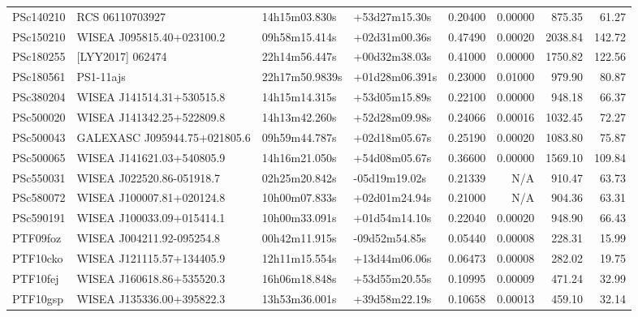 \begin{longtable}{llllrrrr}
PSc140210        &                 RCS 06110703927 &   14h15m03.830s &   +53d27m15.30s &  0.20400 &  0.00000 &   875.35 &       61.27 \\
PSc150210        &       WISEA J095815.40+023100.2 &   09h58m15.414s &   +02d31m00.36s &  0.47490 &  0.00020 &  2038.84 &      142.72 \\
PSc180255        &                [LYY2017] 062474 &   22h14m56.447s &   +00d32m38.03s &  0.41000 &  0.00000 &  1750.82 &      122.56 \\
PSc180561        &                       PS1-11ajs &  22h17m50.9839s &  +01d28m06.391s &  0.23000 &  0.01000 &   979.90 &       80.87 \\
PSc380204        &       WISEA J141514.31+530515.8 &   14h15m14.315s &   +53d05m15.89s &  0.22100 &  0.00000 &   948.18 &       66.37 \\
PSc500020        &       WISEA J141342.25+522809.8 &   14h13m42.260s &   +52d28m09.98s &  0.24066 &  0.00016 &  1032.45 &       72.27 \\
PSc500043        &  GALEXASC J095944.75+021805.6   &   09h59m44.787s &   +02d18m05.67s &  0.25190 &  0.00020 &  1083.80 &       75.87 \\
PSc500065        &       WISEA J141621.03+540805.9 &   14h16m21.050s &   +54d08m05.67s &  0.36600 &  0.00000 &  1569.10 &      109.84 \\
PSc550031        &       WISEA J022520.86-051918.7 &   02h25m20.842s &   -05d19m19.02s &  0.21339 &      N/A &   910.47 &       63.73 \\
PSc580072        &       WISEA J100007.81+020124.8 &   10h00m07.833s &   +02d01m24.94s &  0.21000 &      N/A &   904.36 &       63.31 \\
PSc590191        &       WISEA J100033.09+015414.1 &   10h00m33.091s &   +01d54m14.10s &  0.22040 &  0.00020 &   948.90 &       66.43 \\
PTF09foz         &       WISEA J004211.92-095254.8 &   00h42m11.915s &   -09d52m54.85s &  0.05440 &  0.00008 &   228.31 &       15.99 \\
PTF10cko         &       WISEA J121115.57+134405.9 &   12h11m15.554s &   +13d44m06.06s &  0.06473 &  0.00008 &   282.02 &       19.75 \\
PTF10fej         &       WISEA J160618.86+535520.3 &   16h06m18.848s &   +53d55m20.55s &  0.10995 &  0.00009 &   471.24 &       32.99 \\
PTF10gsp         &       WISEA J135336.00+395822.3 &   13h53m36.001s &   +39d58m22.19s &  0.10658 &  0.00013 &   459.10 &       32.14 \\

\end{longtable}
